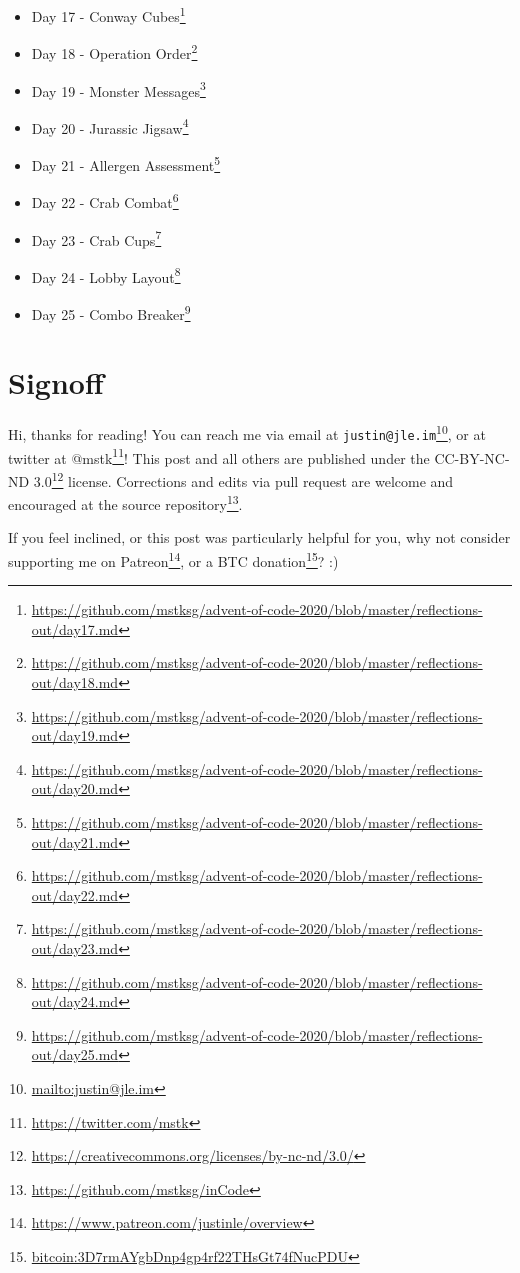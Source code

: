 \documentclass[]{article}
\renewcommand{\href}[2]{#2\footnote{\url{#1}}}
\begin{document}
\begin{itemize}
  \href{https://github.com/mstksg/advent-of-code-2020/blob/master/reflections-out/day16.md}{Day
  16 - Ticket Translation}
\item
  \href{https://github.com/mstksg/advent-of-code-2020/blob/master/reflections-out/day17.md}{Day
  17 - Conway Cubes}
\item
  \href{https://github.com/mstksg/advent-of-code-2020/blob/master/reflections-out/day18.md}{Day
  18 - Operation Order}
\item
  \href{https://github.com/mstksg/advent-of-code-2020/blob/master/reflections-out/day19.md}{Day
  19 - Monster Messages}
\item
  \href{https://github.com/mstksg/advent-of-code-2020/blob/master/reflections-out/day20.md}{Day
  20 - Jurassic Jigsaw}
\item
  \href{https://github.com/mstksg/advent-of-code-2020/blob/master/reflections-out/day21.md}{Day
  21 - Allergen Assessment}
\item
  \href{https://github.com/mstksg/advent-of-code-2020/blob/master/reflections-out/day22.md}{Day
  22 - Crab Combat}
\item
  \href{https://github.com/mstksg/advent-of-code-2020/blob/master/reflections-out/day23.md}{Day
  23 - Crab Cups}
\item
  \href{https://github.com/mstksg/advent-of-code-2020/blob/master/reflections-out/day24.md}{Day
  24 - Lobby Layout}
\item
  \href{https://github.com/mstksg/advent-of-code-2020/blob/master/reflections-out/day25.md}{Day
  25 - Combo Breaker}
\end{itemize}

\section{Signoff}\label{signoff}

Hi, thanks for reading! You can reach me via email at
\href{mailto:justin@jle.im}{\nolinkurl{justin@jle.im}}, or at twitter at
\href{https://twitter.com/mstk}{@mstk}! This post and all others are published
under the \href{https://creativecommons.org/licenses/by-nc-nd/3.0/}{CC-BY-NC-ND
3.0} license. Corrections and edits via pull request are welcome and encouraged
at \href{https://github.com/mstksg/inCode}{the source repository}.

If you feel inclined, or this post was particularly helpful for you, why not
consider \href{https://www.patreon.com/justinle/overview}{supporting me on
Patreon}, or a \href{bitcoin:3D7rmAYgbDnp4gp4rf22THsGt74fNucPDU}{BTC donation}?
:)
\end{document}
